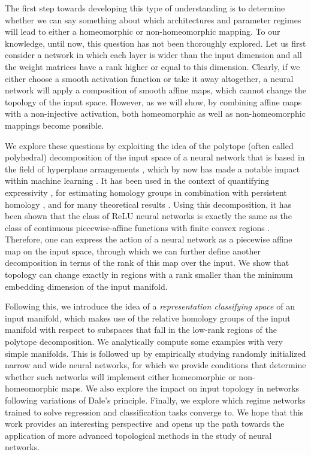 The first step towards developing this type of understanding is to determine whether we can say something about which architectures and parameter regimes will lead to either a homeomorphic or non-homeomorphic mapping. To our knowledge, until now, this question has not been thoroughly explored. Let us first consider a network in which each layer is wider than the input dimension and all the weight matrices have a rank higher or equal to this dimension. Clearly, if we either choose a smooth activation function or take it away altogether, a neural network will apply a composition of smooth affine maps, which cannot change the topology of the input space. However, as we will show, by combining affine maps with a non-injective activation, both homeomorphic as well as non-homeomorphic mappings become possible.

We explore these questions by exploiting the idea of the polytope (often called polyhedral) decomposition of the input space of a neural network that is based in the field of hyperplane arrangements \cite{stanley2004introduction}, which by now has made a notable impact within machine learning \cite{huchette2023deep}. It has been used in the context of quantifying expressivity \cite{raghu2017expressive}, for estimating homology groups in combination with persistent homology \cite{liu2023relu}, and for many theoretical results \cite{pascanu2013number, rahaman2019spectral, hanin2019deep, rolnick2020reverse,masden2022algorithmic, grigsby2022functional, grigsby2022transversality}. Using this decomposition, it has been shown that the class of ReLU neural networks is exactly the same as the class of continuous piecewise-affine functions with finite convex regions \cite{arora2016understanding, he2018relu, grigsby2022functional}. Therefore, one can express the action of a neural network as a piecewise affine map on the input space, through which we can further define another decomposition in terms of the rank of this map over the input. We show that topology can change exactly in regions with a rank smaller than the minimum embedding dimension of the input manifold.

Following this, we introduce the idea of a \textit{representation classifying space} of an input manifold, which makes use of the relative homology groups of the input manifold with respect to subspaces that fall in the low-rank regions of the polytope decomposition. We analytically compute some examples with very simple manifolds. This is followed up by empirically studying randomly initialized narrow and wide neural networks, for which we provide conditions that determine whether such networks will implement either homeomorphic or non-homeomorphic maps. We also explore the impact on input topology in networks following variations of Dale's principle. Finally, we explore which regime networks trained to solve regression and classification tasks converge to. We hope that this work provides an interesting perspective and opens up the path towards the application of more advanced topological methods in the study of neural networks.


